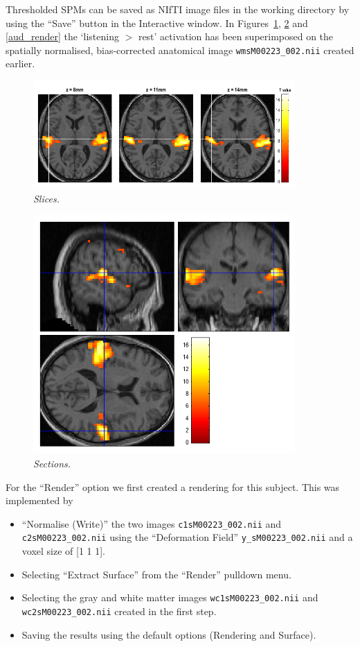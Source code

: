 Thresholded SPMs can be saved as NIfTI image files in the working directory by using the ``Save'' button in the Interactive window. In Figures~\ref{aud_slices}, \ref{aud_sections} and \ref{aud_render} the `listening $>$ rest' activation has been superimposed on the spatially normalised, bias-corrected anatomical image \texttt{wmsM00223\_002.nii} created earlier. 

\begin{figure}
\begin{center}
\includegraphics[width=100mm]{auditory/slices}
\caption{\emph{Slices.} \label{aud_slices} }
\end{center}
\end{figure}

\begin{figure}
\begin{center}
\includegraphics[width=100mm]{auditory/sections}
\caption{\emph{Sections.} \label{aud_sections} }
\end{center}
\end{figure}

For the ``Render'' option we first created a rendering for this subject. This was implemented by 

\begin{itemize}
\item ``Normalise (Write)'' the two images \texttt{c1sM00223\_002.nii} and \texttt{c2sM00223\_002.nii} using the ``Deformation Field'' \texttt{y\_sM00223\_002.nii} and a voxel size of [1 1 1].
\item Selecting ``Extract Surface'' from the ``Render'' pulldown menu.
\item Selecting the gray and white matter images \texttt{wc1sM00223\_002.nii} and \texttt{wc2sM00223\_002.nii} created in the first step.
\item Saving the results using the default options (Rendering and Surface).
\end{itemize}

